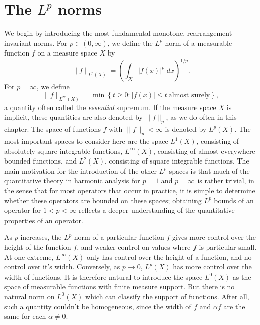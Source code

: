 \section{The $L^p$ norms}

We begin by introducing the most fundamental monotone, rearrangement invariant norms. For $p \in (0,\infty)$, we define the $L^p$ norm of a measurable function $f$ on a measure space $X$ by
%
\[ \| f \|_{L^p(X)} = \left( \int_X |f(x)|^p\; dx \right)^{1/p}. \]
%
For $p = \infty$, we define
%
\[ \| f \|_{L^\infty(X)} = \min \left\{ t \geq 0: |f(x)| \leq t\ \text{almost surely} \right\}, \]
%
a quantity often called the \emph{essential} supremum. If the measure space $X$ is implicit, these quantities are also denoted by $\| f \|_p$, as we do often in this chapter. The space of functions $f$ with $\| f \|_p < \infty$ is denoted by $L^p(X)$. The most important spaces to consider here are the space $L^1(X)$, consisting of absolutely square integrable functions, $L^\infty(X)$, consisting of almost-everywhere bounded functions, and $L^2(X)$, consisting of square integrable functions. The main motivation for the introduction of the other $L^p$ spaces is that much of the quantitative theory in harmonic analysis for $p = 1$ and $p = \infty$ is rather trivial, in the sense that for most operators that occur in practice, it is simple to determine whether these operators are bounded on these spaces; obtaining $L^p$ bounds of an operator for $1 < p < \infty$ reflects a deeper understanding of the quantitative properties of an operator.

As $p$ increases, the $L^p$ norm of a particular function $f$ gives more control over the height of the function $f$, and weaker control on values where $f$ is particular small. At one extreme, $L^\infty(X)$ only has control over the height of a function, and no control over it's width. Conversely, as $p \to 0$, $L^p(X)$ has more control over the width of functions. It is therefore natural to introduce the space $L^0(X)$ as the space of measurable functions with finite measure support. But there is no natural norm on $L^0(X)$ which can classify the support of functions. After all, such a quantity couldn't be homogeneous, since the width of $f$ and $\alpha f$ are the same for each $\alpha \neq 0$.

